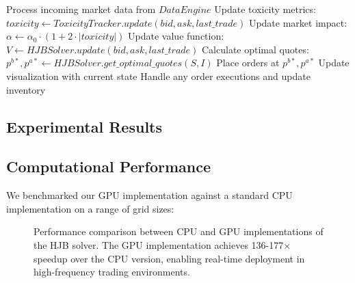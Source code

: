 \documentclass[twocolumn,11pt]{IEEEtran}  %
\begin{document}
\begin{onecolumn}
\begin{onecolumn}
\begin{algorithm}
\begin{algorithmic}[1]
    \State Process incoming market data from $DataEngine$
    \State Update toxicity metrics: $toxicity \gets ToxicityTracker.update(bid, ask, last\_trade)$
    \State Update market impact: $\alpha \gets \alpha_0 \cdot (1 + 2 \cdot |toxicity|)$
    \State Update value function: $V \gets HJBSolver.update(bid, ask, last\_trade)$
    \State Calculate optimal quotes: $p^{b*}, p^{a*} \gets HJBSolver.get\_optimal\_quotes(S, I)$
    \State Place orders at $p^{b*}, p^{a*}$
    \State Update visualization with current state
    \State Handle any order executions and update inventory
\EndWhile
\end{algorithmic}
\end{algorithm}



\end{onecolumn}

\begin{onecolumn}
\section{Experimental Results}

\subsection{Computational Performance}

We benchmarked our GPU implementation against a standard CPU implementation on a range of grid sizes:

\begin{figure}[h]
\centering
{}
\caption{Performance comparison between CPU and GPU implementations of the HJB solver. The GPU implementation achieves 136-177× speedup over the CPU version, enabling real-time deployment in high-frequency trading environments.}
\label{fig:performance}
\end{figure}


\end{onecolumn}
\end{onecolumn}
\end{document}
